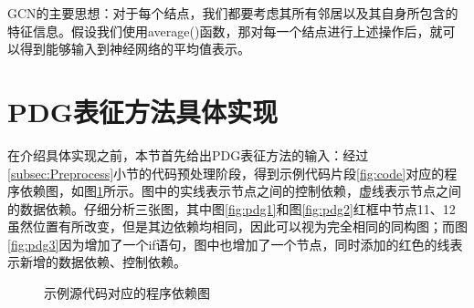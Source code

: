 GCN的主要思想：对于每个结点，我们都要考虑其所有邻居以及其自身所包含的特征信息。假设我们使用average()函数，那对每一个结点进行上述操作后，就可以得到能够输入到神经网络的平均值表示。




\section{PDG表征方法具体实现}
\label{sec:PDGachieve}
在介绍具体实现之前，本节首先给出PDG表征方法的输入：经过\ref{subsec:Preprocess}小节的代码预处理阶段，得到示例代码片段\ref{fig:code}对应的程序依赖图，如图\ref{fig:pdgcode}所示。图中的实线表示节点之间的控制依赖，虚线表示节点之间的数据依赖。仔细分析三张图，其中图\ref{fig:pdg1}和图\ref{fig:pdg2}红框中节点11、12虽然位置有所改变，但是其边依赖均相同，因此可以视为完全相同的同构图；而图\ref{fig:pdg3}因为增加了一个if语句，图中也增加了一个节点，同时添加的红色的线表示新增的数据依赖、控制依赖。

\begin{figure}[htbp]
  \centering  %
  \caption{示例源代码对应的程序依赖图}    %
  \label{fig:pdgcode}    %
\end{figure}

